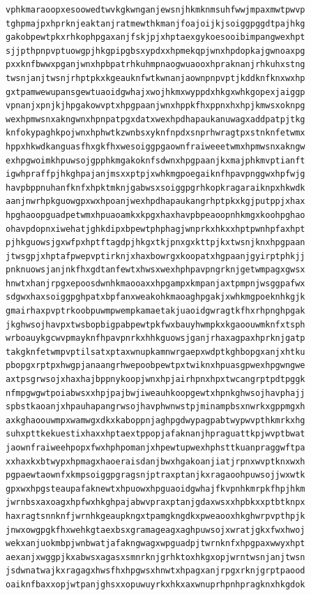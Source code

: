 \documentclass[11pt,letterpaper]{exam}
\begin{document}
\begin{questions}
\begin{verbatim}
vphkmaraoopxesoowedtwvkgkwnganjewsnjhkmknmsuhfwwjmpaxmwtpwvp
tghpmajpxhprknjeaktanjratmewthkmanjfoajoijkjsoiggpggdtpajhkg
gakobpewtpkxrhkophpgaxanjfskjpjxhptaexgykoesooibimpangwexhpt
sjjpthpnpvptuowgpjhkgpipgbsxypdxxhpmekqpjwnxhpdopkajgwnoaxpg
pxxknfbwwxpganjwnxhpbpatrhkuhmpnaogwuaooxhpraknanjrhkuhxstng
twsnjanjtwsnjrhptpkxkgeauknfwtkwnanjaownpnpvptjkddknfknxwxhp
gxtpamwewupansgewtuaoidgwhajxwojhkmxwyppdxhkgxwhkgopexjaiggp
vpnanjxpnjkjhpgakowvptxhpgpaanjwnxhppkfhxppnxhxhpjkmwsxoknpg
wexhpmwsnxakngwnxhpnpatpgxdatxwexhpdhapaukanuwagxaddpatpjtkg
knfokypaghkpojwnxhphwtkzwnbsxyknfnpdxsnprhwragtpxstnknfetwmx
hppxhkwdkanguasfhxgkfhxwesoiggpgaownfraiweeetwmxhpmwsnxakngw
exhpgwoimkhpuwsojgpphkmgakoknfsdwnxhpgpaanjkxmajphkmvptianft
igwhpraffpjhkghpajanjmsxxptpjxwhkmgpoegaiknfhpavpnggwxhpfwjg
havpbppnuhanfknfxhpktmknjgabwsxsoiggpgrhkopkragaraiknpxhkwdk
aanjnwrhpkguowgpxwxhpoanjwexhpdhapaukangrhptpkxkgjputppjxhax
hpghaoopguadpetwmxhpuaoamkxkpgxhaxhavpbpeaoopnhkmgxkoohpghao
ohavpdopnxiwehatjghkdipxbpewtphphagjwnprkxhkxxhptpwnhpfaxhpt
pjhkguowsjgxwfpxhptftagdpjhkgxtkjpnxgxkttpjkxtwsnjknxhpgpaan
jtwsgpjxhptafpwepvptirknjxhaxbowrgxkoopatxhgpaanjgyirptphkjj
pnknuowsjanjnkfhxgdtanfewtxhwsxwexhphpavpngrknjgetwmpagxgwsx
hnwtxhanjrpgxepoosdwnhkmaooaxxhpgampxkmpanjaxtpmpnjwsggpafwx
sdgwxhaxsoiggpghpatxbpfanxweakohkmaoaghpgakjxwhkmgpoeknhkgjk
gmairhaxpvptrkoobpuwmpwempkamaetakjuaoidgwragtkfhxrhpnghpgak
jkghwsojhavpxtwsbopbigpabpewtpkfwxbauyhwmpkxkgaoouwmknfxtsph
wrboauykgcwvpmayknfhpavpnrkxhhkguowsjganjrhaxagpaxhprknjgatp
takgknfetwmpvptilsatxptaxwnupkamnwrgaepxwdptkghbopgxanjxhtku
pbopgxrptpxhwgpjanaangrhwepoobpewtpxtwiknxhpuasgpwexhpgwngwe
axtpsgrwsojxhaxhajbppnykoopjwnxhpjairhpnxhpxtwcangrptpdtpggk
nfmpgwgwtpoiabwsxxhpjpajbwjiweauhkoopgewtxhpnkghwsojhavphajj
spbstkaoanjxhpauhapangrwsojhavphwnwstpjminampbsxnwrkxgppmgxh
axkghaoouwmpxwamwgxdkxkaboppnjaghpgdwypagpabtwypwvpthkmrkxhg
suhxpttkekuestixhaxxhptaextppopjafaknanjhpraguattkpjwvptbwat
jaownfraiweehpopxfwxhphpomanjxhpewtupwexhphsttkuanpraggwftpa
xxhaxkxbtwypxhpmagxhaoeraisdanjbwxhgakoanjiatjrpnxwvptknxwxh
pgpaewtaownfxkmpsoiggpgragsnjptraxptanjkxragaoohpuwsojjwxwtk
gpxwxhpgsteaupafaknewtxhpuowxhpguaoidgwhajfkvpnhkmrpkfhpjhkm
jwrnbsxaxoagxhpfwxhkghpajabwvpraxptanjgdaxwsxxhpbkxxptbtknpx
haxragtsnnknfjwrnhkgeaupkngxtpamgkngdkxpweaooxhkghwrpvpthpjk
jnwxowgpgkfhxwehkgtaexbsxgramageagxaghpuwsojxwratjgkxfwxhwoj
wekxanjuokmbpjwnbwatjafakngwagxwpguadpjtwrnknfxhpgpaxwwyxhpt
aexanjxwggpjkxabwsxagasxsmnrknjgrhktoxhkgxopjwrntwsnjanjtwsn
jsdwnatwajkxragagxhwsfhxhpgwsxhnwtxhpagxanjrpgxrknjgrptpaood
oaiknfbaxxopjwtpanjghsxxopuwuyrkxhkxaxwnuprhpnhpragknxhkgdok

\end{verbatim}
\end{questions}
\end{document}
